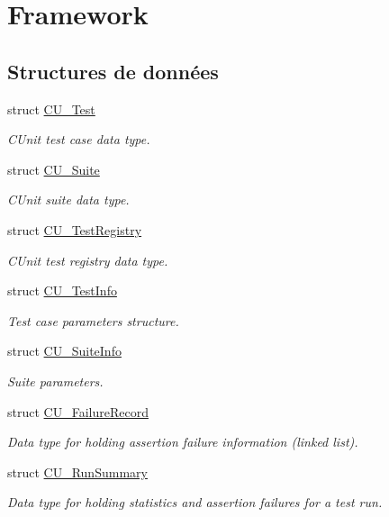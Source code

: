 \hypertarget{group__Framework}{\section{Framework}
\label{group__Framework}
}
\subsection*{Structures de données}
\begin{DoxyCompactItemize}
\item 
struct \hyperlink{structCU__Test}{C\-U\-\_\-\-Test}
\begin{DoxyCompactList}\small\item\em C\-Unit test case data type. \end{DoxyCompactList}\item 
struct \hyperlink{structCU__Suite}{C\-U\-\_\-\-Suite}
\begin{DoxyCompactList}\small\item\em C\-Unit suite data type. \end{DoxyCompactList}\item 
struct \hyperlink{structCU__TestRegistry}{C\-U\-\_\-\-Test\-Registry}
\begin{DoxyCompactList}\small\item\em C\-Unit test registry data type. \end{DoxyCompactList}\item 
struct \hyperlink{structCU__TestInfo}{C\-U\-\_\-\-Test\-Info}
\begin{DoxyCompactList}\small\item\em Test case parameters structure. \end{DoxyCompactList}\item 
struct \hyperlink{structCU__SuiteInfo}{C\-U\-\_\-\-Suite\-Info}
\begin{DoxyCompactList}\small\item\em Suite parameters. \end{DoxyCompactList}\item 
struct \hyperlink{structCU__FailureRecord}{C\-U\-\_\-\-Failure\-Record}
\begin{DoxyCompactList}\small\item\em Data type for holding assertion failure information (linked list). \end{DoxyCompactList}\item 
struct \hyperlink{structCU__RunSummary}{C\-U\-\_\-\-Run\-Summary}
\begin{DoxyCompactList}\small\item\em Data type for holding statistics and assertion failures for a test run. \end{DoxyCompactList}\end{DoxyCompactItemize}
